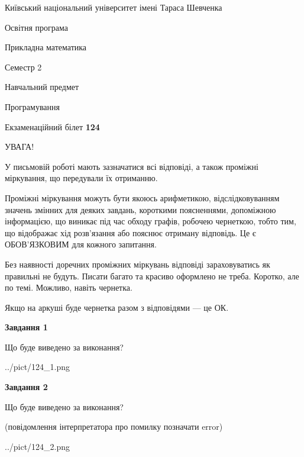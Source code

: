\documentclass[12pt, ukrainian]{article}
\begin{document}
{{\begin {small}\par
{ \center  Київський національний університет імені Тараса Шевченка \par}
{\parbox {5 cm}{Освітня програма \hfill}{\parbox {7 cm}{Прикладна математика\hfill}}\parbox {6 cm}{\hfill Семестр 2}}\par
{\parbox {5 cm} {Навчальний предмет \hfill}\parbox {7 cm}{Програмування \hfill}\parbox {6cm}{\hfill}\par}\vspace{-7pt} \end{small}}{\center Екзаменаційний білет \No \textbf
{ 124 }\par}}
{
\begin {large}
УВАГА!

У письмовій роботі мають зазначатися всі відповіді, а також проміжні міркування, що передували їх отриманню.

Проміжні міркування можуть бути якоюсь арифметикою, відслідковуванням зна\-чень змінних для деяких завдань,
короткими поясненнями, допоміжною інформацією, що виникає під час обходу графів, робочею чернеткою,
тобто тим, що відображає хід розв’язання або пояснює отриману відповідь.
Це є ОБОВ’ЯЗКОВИМ для кожного запитання.

Без наявності доречних проміжних міркувань відповіді зараховуватись як правиль\-ні не будуть.
Писати багато та красиво оформлено не треба. Коротко, але по темі. Можли\-во, навіть чернетка.

Якщо на аркуші буде чернетка разом з відповідями --- це ОК.

\newpage

{\begin {center}\textbf{Завдання 1}\end {center}}\par
Що буде виведено за виконання?\par
\begin{center}
	{../pict/124_1.png}
\end{center}
\newpage

{\begin {center}\textbf{Завдання 2}\end {center}}\par
Що буде виведено за виконання?\par
 (повідомлення інтерпретатора про помилку позначати error)\par
\begin{center}
	{../pict/124_2.png}
\end{center}
\newpage


\end{large}}
\end{document}
